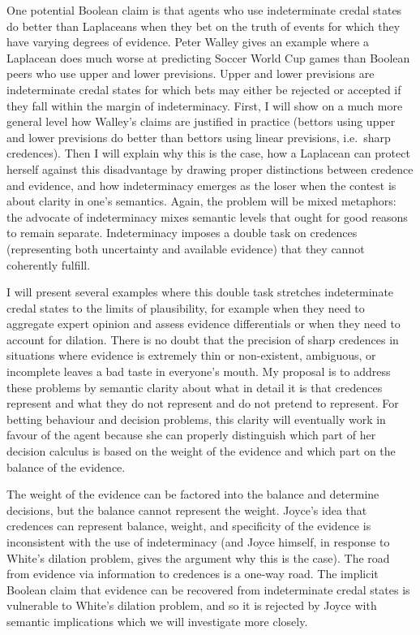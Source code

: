 \documentclass[11pt]{article}
\begin{document}
One potential Boolean claim is that agents who use indeterminate
credal states do better than Laplaceans when they bet on the truth of
events for which they have varying degrees of evidence. Peter Walley
gives an example where a Laplacean does much worse at predicting
Soccer World Cup games than Boolean peers who use upper and lower
previsions. Upper and lower previsions are indeterminate credal states
for which bets may either be rejected or accepted if they fall within
the margin of indeterminacy. First, I will show on a much more general
level how Walley's claims are justified in practice (bettors using
upper and lower previsions do better than bettors using linear
previsions, i.e.\ sharp credences). Then I will explain why this is
the case, how a Laplacean can protect herself against this
disadvantage by drawing proper distinctions between credence and
evidence, and how indeterminacy emerges as the loser when the contest
is about clarity in one's semantics. Again, the problem will be mixed
metaphors: the advocate of indeterminacy mixes semantic levels that
ought for good reasons to remain separate. Indeterminacy imposes a
double task on credences (representing both uncertainty and available
evidence) that they cannot coherently fulfill.

I will present several examples where this double task stretches
indeterminate credal states to the limits of plausibility, for example
when they need to aggregate expert opinion and assess evidence
differentials or when they need to account for dilation. There is no
doubt that the precision of sharp credences in situations where
evidence is extremely thin or non-existent, ambiguous, or incomplete
leaves a bad taste in everyone's mouth. My proposal is to address
these problems by semantic clarity about what in detail it is that
credences represent and what they do not represent and do not pretend
to represent. For betting behaviour and decision problems, this
clarity will eventually work in favour of the agent because she can
properly distinguish which part of her decision calculus is based on
the weight of the evidence and which part on the balance of the
evidence.

The weight of the evidence can be factored into the balance and
determine decisions, but the balance cannot represent the weight.
Joyce's idea that credences can represent balance, weight, and
specificity of the evidence is inconsistent with the use of
indeterminacy (and Joyce himself, in response to White's dilation
problem, gives the argument why this is the case). The road from
evidence via information to credences is a one-way road. The implicit
Boolean claim that evidence can be recovered from indeterminate credal
states is vulnerable to White's dilation problem, and so it is
rejected by Joyce with semantic implications which we will
investigate more closely.
\end{document}
